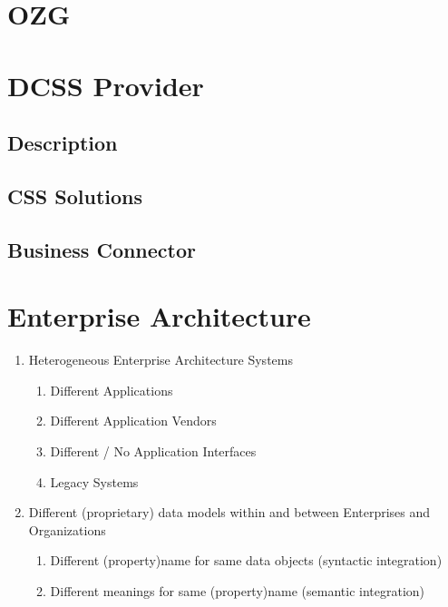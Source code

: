 \documentclass[
     12pt,         %
     a4paper,      %
     BCOR10mm,     %
     DIV14,        %
aragraph skip instad of paragraph indent
     ]{scrreprt}
\begin{document}
\section{OZG}



\section{DCSS Provider}

\subsection{Description}

\subsection{CSS Solutions}

\subsection{Business Connector}

\section{Enterprise Architecture}

\begin{enumerate}
     \item Heterogeneous Enterprise Architecture Systems
           \begin{enumerate}
                \item Different Applications
                \item Different Application Vendors
                \item Different / No Application Interfaces
                \item Legacy Systems
           \end{enumerate}
     \item Different (proprietary) data models within and between Enterprises and Organizations
           \begin{enumerate}
                \item Different (property)name for same data objects (syntactic integration)
                \item Different meanings for same (property)name (semantic integration)
           \end{enumerate}
\end{enumerate}
\end{document}
